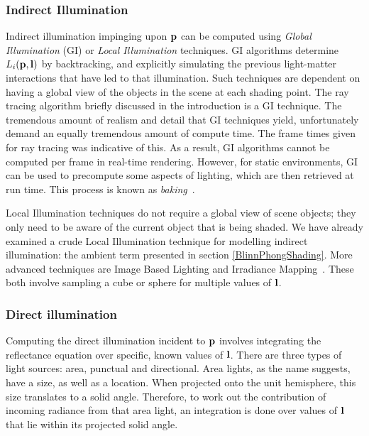 \subsubsection{Indirect Illumination}

Indirect illumination impinging upon \begin{math}\mathbf{p}\end{math} can be computed using \textit{Global Illumination} (GI) or \textit{Local Illumination} techniques. GI algorithms determine \begin{math}L_i(\mathbf{p}, \mathbf{l})\end{math} by backtracking, and explicitly simulating the previous light-matter interactions that have led to that illumination. Such techniques are dependent on having a global view of the objects in the scene at each shading point. The ray tracing algorithm briefly discussed in the introduction is a GI technique. The tremendous amount of realism and detail that GI techniques yield, unfortunately demand an equally tremendous amount of compute time. The frame times given for ray tracing was indicative of this. As a result, GI algorithms cannot be computed per frame in real-time rendering. However, for static environments, GI can be used to precompute some aspects of lighting, which are then retrieved at run time. This process is known as \textit{baking}~\cite{UberBake}.

Local Illumination techniques do not require a global view of scene objects; they only need to be aware of the current object that is being shaded. We have already examined a crude Local Illumination technique for modelling indirect illumination: the ambient term presented in section \ref{BlinnPhongShading}. More advanced techniques are Image Based Lighting and Irradiance Mapping~\cite{HoffmanPBSBackground}\cite{IrradianceMaps}. These both involve sampling a cube or sphere for multiple values of \begin{math}\mathbf{l}\end{math}.

\subsubsection{Direct illumination}

Computing the direct illumination incident to \begin{math}\mathbf{p}\end{math} involves integrating the reflectance equation over specific, known values of \begin{math}\mathbf{l}\end{math}. There are three types of light sources: area, punctual and directional. Area lights, as the name suggests, have a size, as well as a location. When projected onto the unit hemisphere, this size translates to a solid angle. Therefore, to work out the contribution of incoming radiance from that area light, an integration is done over values of \begin{math}\mathbf{l}\end{math} that lie within its projected solid angle.

